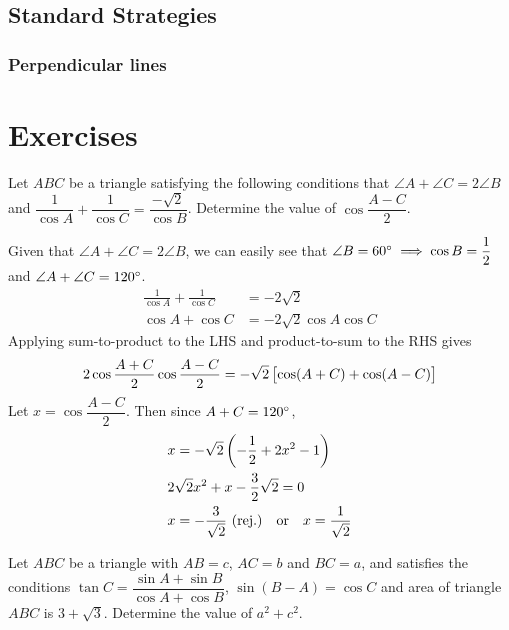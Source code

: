 \subsection{Standard Strategies}
\subsubsection{Perpendicular lines}
\pagebreak

\section*{Exercises}
\begin{prbm}
Let $ABC$ be a triangle satisfying the following conditions that $\angle A+\angle C=2\angle B$ and $\dfrac{1}{\cos A}+\dfrac{1}{\cos C}=\dfrac{-\sqrt{2}}{\cos B}$. Determine the value of $\cos\dfrac{A-C}{2}$.
\end{prbm}

\begin{solution}
Given that $\angle A+\angle C=2\angle B$, we can easily see that $\angle B=60\degree \implies \cos B=\dfrac{1}{2}$ and $\angle A+\angle C=120\degree$.
\begin{align*}
\frac{1}{\cos A}+\frac{1}{\cos C} &= -2\sqrt{2} \\
\cos A+\cos C &= -2\sqrt{2}\cos A\cos C
\end{align*}
Applying sum-to-product to the LHS and product-to-sum to the RHS gives
\[ 2\cos\frac{A+C}{2}\cos\frac{A-C}{2}=-\sqrt{2}\left[\cos(A+C)+\cos(A-C)\right] \]
Let $x=\cos\dfrac{A-C}{2}$. Then since $A+C=120\degree$,
\begin{align*}
&x=-\sqrt{2}\left(-\frac{1}{2}+2x^2-1\right) \\
&2\sqrt{2}x^2+x-\frac{3}{2}\sqrt{2}=0 \\
&x=-\frac{3}{\sqrt{2}}\text{ (rej.)} \quad \text{or} \quad x=\frac{1}{\sqrt{2}}
\end{align*}
\end{solution}

\begin{prbm}
Let $ABC$ be a triangle with $AB=c$, $AC=b$ and $BC=a$, and satisfies the conditions $\tan C=\dfrac{\sin A+\sin B}{\cos A+\cos B}$, $\sin(B-A)=\cos C$ and area of triangle $ABC$ is $3+\sqrt{3}$. Determine the value of $a^2+c^2$.
\end{prbm}

